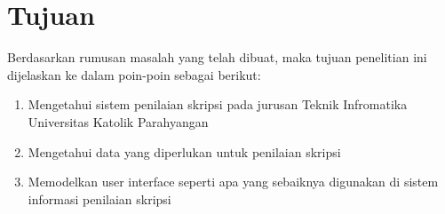 \section{Tujuan}
\label{tujuan}

	Berdasarkan rumusan masalah yang telah dibuat, maka tujuan penelitian ini dijelaskan ke dalam
	poin-poin sebagai berikut:
	\begin{enumerate}
		\item Mengetahui sistem penilaian skripsi pada jurusan Teknik Infromatika Universitas Katolik Parahyangan
		\item Mengetahui data yang diperlukan untuk penilaian skripsi
		\item Memodelkan user interface seperti apa yang sebaiknya digunakan di sistem informasi penilaian skripsi
	\end{enumerate}